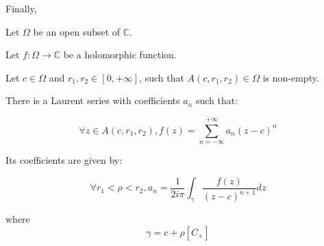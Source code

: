 Finally, 
\begin{thm*}
    Let $\Omega$ be an open subset of $\mathbb{C}$.

    Let $f: \Omega \rightarrow \mathbb{C}$ be a holomorphic function.
    
    Let $c\in\Omega$ and $r_1, r_2\in[0, +\infty]$, such that $A(c,r_1, r_2)\in\Omega$ is non-empty.

    There is a Laurent series with coefficients $a_n$ such that:

    $$ \forall z \in A(c, r_1, r_2), f(z) = \sum_{n=-\infty}^{+\infty}a_n(z-c)^n$$

Its coefficients are given by:

$$ \forall r_1 < \rho < r_2, 
a_n = \frac{1}{2i\pi} \int_\gamma \frac{f(z)}{{(z-c)^{n+1}}}dz$$

where 
$$ \gamma = c + \rho[C_+]$$
\end{thm*}



